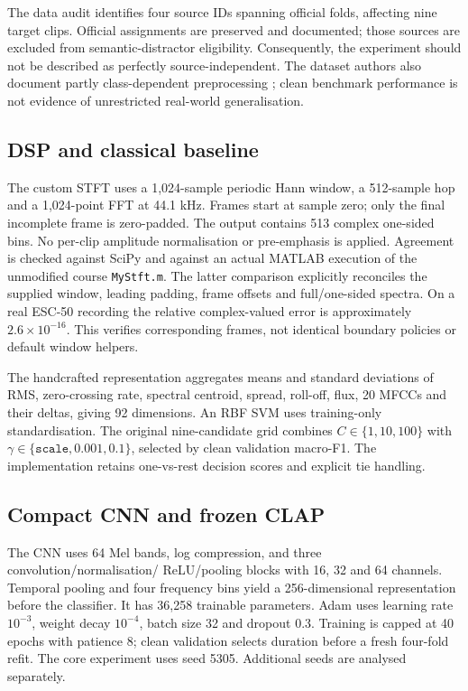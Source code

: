 \documentclass[a4paper,10pt]{article}
\begin{document}
The data audit identifies four source IDs spanning official folds, affecting
nine target clips. Official assignments are preserved and documented; those
sources are excluded from semantic-distractor eligibility. Consequently, the
experiment should not be described as perfectly source-independent. The
dataset authors also document partly class-dependent preprocessing
\cite{esc_repo}; clean benchmark performance is not evidence of unrestricted
real-world generalisation.

\subsection{DSP and classical baseline}
The custom STFT uses a 1,024-sample periodic Hann window, a 512-sample hop and a
1,024-point FFT at 44.1 kHz. Frames start at sample zero; only the final incomplete
frame is zero-padded. The output contains 513 complex one-sided bins. No
per-clip amplitude normalisation or pre-emphasis is applied. Agreement is checked
against SciPy and against an actual MATLAB execution of the unmodified course
\texttt{MyStft.m}. The latter comparison explicitly reconciles the supplied
window, leading padding, frame offsets and full/one-sided spectra. On a real
ESC-50 recording the relative complex-valued error is approximately
$2.6\times10^{-16}$. This verifies corresponding frames, not identical boundary
policies or default window helpers.

The handcrafted representation aggregates means and standard deviations of
RMS, zero-crossing rate, spectral centroid, spread, roll-off, flux, 20 MFCCs and
their deltas, giving 92 dimensions. An RBF SVM uses training-only standardisation.
The original nine-candidate grid combines $C\in\{1,10,100\}$ with
$\gamma\in\{\texttt{scale},0.001,0.1\}$, selected by clean validation macro-F1.
The implementation retains one-vs-rest decision scores and explicit tie handling.

\subsection{Compact CNN and frozen CLAP}
The CNN uses 64 Mel bands, log compression, and three convolution/normalisation/
ReLU/pooling blocks with 16, 32 and 64 channels. Temporal pooling and four
frequency bins yield a 256-dimensional representation before the classifier.
It has 36,258 trainable parameters. Adam uses learning rate $10^{-3}$, weight decay
$10^{-4}$, batch size 32 and dropout 0.3. Training is capped at 40 epochs with
patience 8; clean validation selects duration before a fresh four-fold refit.
The core experiment uses seed 5305. Additional seeds are analysed separately.
\end{document}
